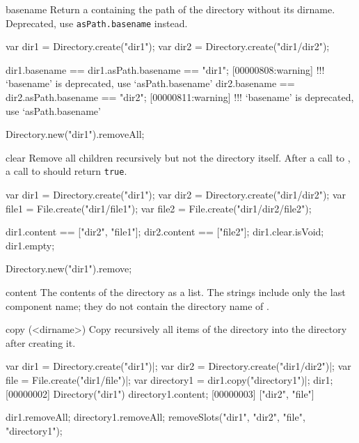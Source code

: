 \begin{urbiscriptapi}
\item[basename] Return a  containing the path of the
  directory without its dirname.  Deprecated, use
  \lstinline|asPath.basename| instead.
\begin{urbiassert}[firstnumber=1]
var dir1 = Directory.create("dir1");
var dir2 = Directory.create("dir1/dir2");

dir1.basename == dir1.asPath.basename == "dir1";
[00000808:warning] !!! `basename' is deprecated, use `asPath.basename'
dir2.basename == dir2.asPath.basename == "dir2";
[00000811:warning] !!! `basename' is deprecated, use `asPath.basename'
\end{urbiassert}
\begin{urbicomment}
Directory.new("dir1").removeAll;
\end{urbicomment}


\item[clear]
  Remove all children recursively but not the directory itself. After a
  call to , a call to  should return
  \lstinline|true|.
\begin{urbiassert}
var dir1 = Directory.create("dir1");
var dir2 = Directory.create("dir1/dir2");
var file1 = File.create("dir1/file1");
var file2 = File.create("dir1/dir2/file2");

dir1.content == ["dir2", "file1"];
dir2.content == ["file2"];
dir1.clear.isVoid;
dir1.empty;
\end{urbiassert}
\begin{urbicomment}
Directory.new("dir1").remove;
\end{urbicomment}


\item[content]
  The contents of the directory as a  list.  The
  strings include only the last component name; they do not contain
  the directory name of \this.


\item[copy](<dirname>)
  Copy recursively all items of the \this directory
  into the directory  after creating it.
\begin{urbiscript}
var dir1 = Directory.create("dir1")|;
var dir2 = Directory.create("dir1/dir2")|;
var file = File.create("dir1/file")|;
var directory1 = dir1.copy("directory1")|;
dir1;
[00000002] Directory("dir1")
directory1.content;
[00000003] ["dir2", "file"]
\end{urbiscript}
\begin{urbicomment}
dir1.removeAll;
directory1.removeAll;
removeSlots("dir1", "dir2", "file", "directory1");
\end{urbicomment}



\end{urbiscriptapi}
